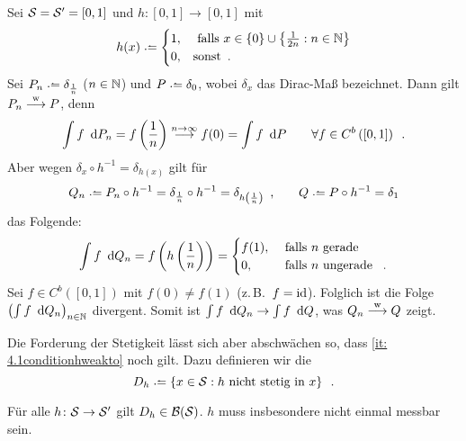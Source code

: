 %
\begin{beispiel}\label{beispiel: 4.8}
	Sei $\S = \S' = [0,1]$ und $h \colon [0,1] \to [0,1]$ mit
	\begin{align*}
		h(x)\defeq
		\begin{cases}
			1, &\falls x \in \menge{0} \cup \menge{\frac{1}{2n} : n \in \N} \\
			0, & \text{sonst} \satzende
		\end{cases}
	\end{align*}
	Sei $P_n \defeq \delta_{\frac{1}{n}}$ ($n\in\N$) und $P \defeq \delta_{0}$, wobei $\delta_x$ das Dirac-Maß bezeichnet.
	Dann gilt $P_n \weakto P$, denn
	\begin{equation*}
		\int f \diffskip{P_n} = f \brackets{\frac{1}{n}} \ntoinf f(0) = \int f \diffskip P \qquad \forall f \in C^b \brackets{[0,1]} \satzende
	\end{equation*}
	Aber wegen $\delta_x \circ h^{-1} = \delta_{h(x)}$ gilt für
	\begin{align*}
		Q_n \defeq P_n \circ h^{-1} 
		= \delta_{\frac{1}{n}} \circ h^{-1}
		=\delta_{h\brackets{\frac{1}{n}}} 
		\komma \qquad 
		Q \defeq P \circ h^{-1} = \delta_1
	\end{align*}
	das Folgende:
	\begin{equation*}
		\int f \diffskip{Q_n} = f \brackets{h \brackets{\frac{1}{n}}}
		=
		\begin{cases}
			f(1), & \falls n \text{ gerade }\\
			0, & \falls n \text{ ungerade } \satzende
		\end{cases}
	\end{equation*}
	Sei $f \in C^b([0,1])$ mit $f(0) \neq f(1)$ (z.\,B.\ $f = \id$).
	Folglich ist die Folge $\brackets{\int f \diffskip{Q_n}}_{n \in \N}$ divergent.
	Somit ist $\int f \diffskip{Q_n} \to \int f \diffskip{Q}$, was $Q_n \weakto Q$ zeigt.
\end{beispiel}

Die Forderung der Stetigkeit lässt sich aber abschwächen so, dass \cref{it: 4.1conditionhweakto} noch gilt.
Dazu definieren wir die 
\begin{equation*}
	D_h \defeq \menge{ x \in \S : h \text{ nicht stetig in } x } \satzende
\end{equation*}

\begin{lemma} \label{lemma: 4.9}
	Für alle $h \colon \S \to \S'$ gilt $D_h \in \B(\S)$. $h$ muss insbesondere nicht einmal messbar sein.
\end{lemma}

